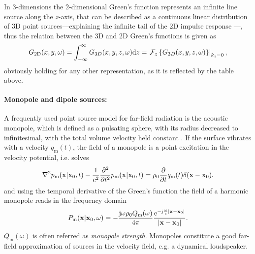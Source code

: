 \vspace{3mm}
In 3-dimensions the 2-dimensional Green's function represents an infinite line source along the $z$-axis, that can be described as a continuous linear distribution of 3D point sources---explaining the infinite tail of the 2D impulse response%
---, thus the relation between the 3D and 2D Green's functions is given as
\begin{equation}
G_{2\mathrm{D}}(x,y,\omega) = \int_{-\infty}^{\infty} G_{3D}(x,y,z,\omega) \mathrm{d} z = \left. \mathcal{F}_{z}\left\{ G_{3D}(x,y,z,\omega) \right\}\right|_{k_z = 0},
\label{Eq:Wave_Theory:2D_Green}
\end{equation} 
obviously holding for any other representation, as it is reflected by the table above.

\paragraph{Monopole and dipole sources:\\} 
A frequently used point source model for far-field radiation is the acoustic monopole, which is defined as a pulsating sphere, with its radius decreased to infinitesimal, with the total volume velocity held constant \cite{Howe2007}. If the surface vibrates with a velocity $q_{\mathrm{m}}(t)$, the field of a monopole is a point excitation in the velocity potential, i.e. solves
\begin{equation}
\nabla^2 p_{\mathrm{m}}(\mathbf{x}|\mathbf{x}_0,t) - 	\frac{1}{c^2}\frac{\partial^2}{\partial t^2}p_{\mathrm{m}}(\mathbf{x}|\mathbf{x}_0,t) = \rho_0 \frac{\partial}{\partial t} q_{\mathrm{m}}(t)\delta(\mathbf{x}-\mathbf{x}_0).
\end{equation}
and using the temporal derivative of the Green's function the field of a harmonic monopole reads in the frequency domain
\begin{equation}
P_{\mathrm{m}}(\mathbf{x}|\mathbf{x}_0,\omega) = -\frac{\mathrm{j} \omega \rho_0 Q_{\mathrm{m}}(\omega)}{4\pi}\frac{\mathrm{e}^{-\mathrm{j} \frac{\omega}{c}|\mathbf{x}-\mathbf{x}_0|}}{|\mathbf{x}-\mathbf{x}_0|}.
\end{equation}
$Q_{\mathrm{m}}(\omega)$ is often referred as \emph{monopole strength}. Monopoles constitute a good far-field approximation of sources in the velocity field, e.g. a dynamical loudspeaker. %

